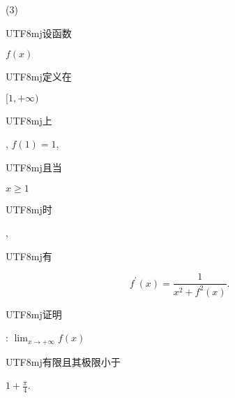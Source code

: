 \documentclass[10pt]{article}
\begin{document}
(3) \begin{CJK}{UTF8}{mj}设函数\end{CJK} $f(x)$ \begin{CJK}{UTF8}{mj}定义在\end{CJK} $[1,+\infty)$ \begin{CJK}{UTF8}{mj}上\end{CJK}, $f(1)=1$, \begin{CJK}{UTF8}{mj}且当\end{CJK} $x \geq 1$ \begin{CJK}{UTF8}{mj}时\end{CJK}, \begin{CJK}{UTF8}{mj}有\end{CJK}
$$
f^{\prime}(x)=\frac{1}{x^{2}+f^{2}(x)} \text {. }
$$
\begin{CJK}{UTF8}{mj}证明\end{CJK}: $\lim _{x \rightarrow+\infty} f(x)$ \begin{CJK}{UTF8}{mj}有限且其极限小于\end{CJK} $1+\frac{\pi}{4}$.
\end{document}
